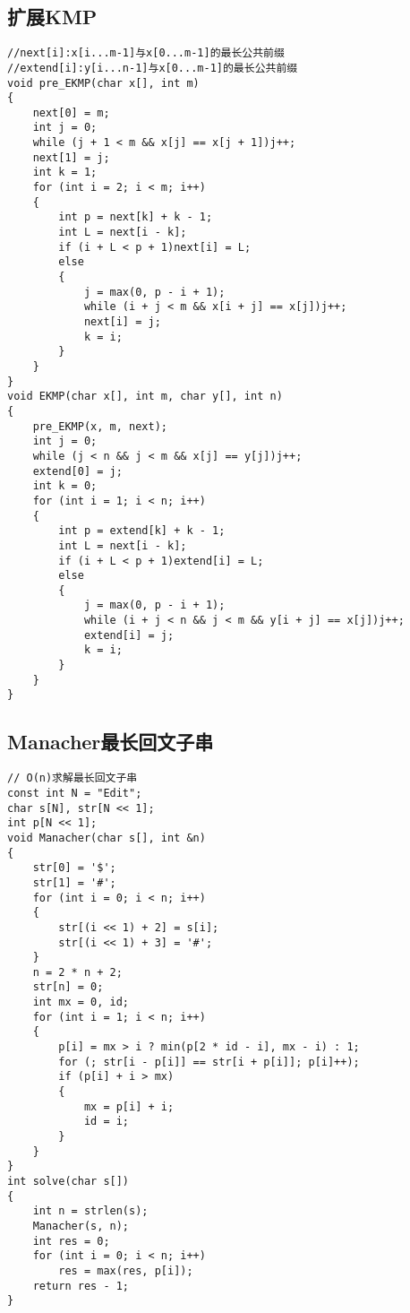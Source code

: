 \documentclass[a4]{article}
\begin{document}
\subsection{扩展KMP}
\begin{lstlisting}
//next[i]:x[i...m-1]与x[0...m-1]的最长公共前缀
//extend[i]:y[i...n-1]与x[0...m-1]的最长公共前缀
void pre_EKMP(char x[], int m)
{
    next[0] = m;
    int j = 0;
    while (j + 1 < m && x[j] == x[j + 1])j++;
    next[1] = j;
    int k = 1;
    for (int i = 2; i < m; i++)
    {
        int p = next[k] + k - 1;
        int L = next[i - k];
        if (i + L < p + 1)next[i] = L;
        else
        {
            j = max(0, p - i + 1);
            while (i + j < m && x[i + j] == x[j])j++;
            next[i] = j;
            k = i;
        }
    }
}
void EKMP(char x[], int m, char y[], int n)
{
    pre_EKMP(x, m, next);
    int j = 0;
    while (j < n && j < m && x[j] == y[j])j++;
    extend[0] = j;
    int k = 0;
    for (int i = 1; i < n; i++)
    {
        int p = extend[k] + k - 1;
        int L = next[i - k];
        if (i + L < p + 1)extend[i] = L;
        else
        {
            j = max(0, p - i + 1);
            while (i + j < n && j < m && y[i + j] == x[j])j++;
            extend[i] = j;
            k = i;
        }
    }
}
\end{lstlisting}
\subsection{Manacher最长回文子串}
\begin{lstlisting}
// O(n)求解最长回文子串
const int N = "Edit";
char s[N], str[N << 1];
int p[N << 1];
void Manacher(char s[], int &n)
{
    str[0] = '$';
    str[1] = '#';
    for (int i = 0; i < n; i++)
    {
        str[(i << 1) + 2] = s[i];
        str[(i << 1) + 3] = '#';
    }
    n = 2 * n + 2;
    str[n] = 0;
    int mx = 0, id;
    for (int i = 1; i < n; i++)
    {
        p[i] = mx > i ? min(p[2 * id - i], mx - i) : 1;
        for (; str[i - p[i]] == str[i + p[i]]; p[i]++);
        if (p[i] + i > mx)
        {
            mx = p[i] + i;
            id = i;
        }
    }
}
int solve(char s[])
{
    int n = strlen(s);
    Manacher(s, n);
    int res = 0;
    for (int i = 0; i < n; i++)
        res = max(res, p[i]);
    return res - 1;
}
\end{lstlisting}
\end{document}
